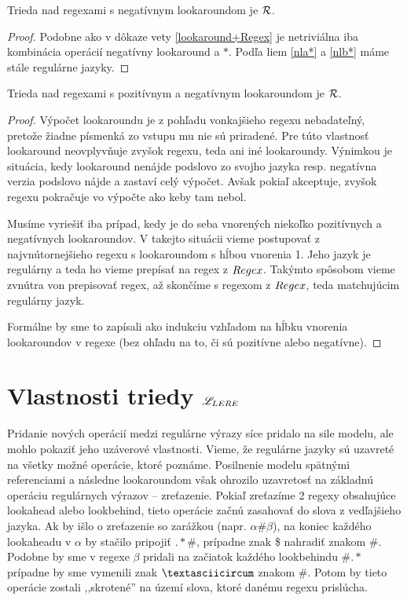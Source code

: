 \begin{veta}\label{nlookaround+R}
Trieda nad regexami s negatívnym lookaroundom je ${\cal R}$.
\end{veta}
\begin{proof}
Podobne ako v dôkaze vety \ref{lookaround+Regex} je netriviálna iba kombinácia operácií negatívny lookaround a $*$. Podľa liem \ref{nla*} a \ref{nlb*} máme stále regulárne jazyky.
\end{proof}

\begin{dosledok}
Trieda nad regexami s pozitívnym a negatívnym lookaroundom je ${\cal R}$.
\end{dosledok}
\begin{proof}
Výpočet lookaroundu je z pohľadu vonkajšieho regexu nebadateľný, pretože žiadne písmenká zo vstupu mu nie sú priradené. Pre túto vlastnosť lookaround ne\-ov\-plyv\-ňu\-je zvyšok regexu, teda ani iné lookaroundy. Výnimkou je situácia, kedy look\-around nenájde podslovo zo svojho jazyka resp. negatívna verzia podslovo nájde a zastaví celý výpočet. Avšak pokiaľ akceptuje, zvyšok regexu pokračuje vo výpočte ako keby tam nebol.

Musíme vyriešiť iba prípad, kedy je do seba vnorených niekoľko pozitívnych a negatívnych lookaroundov. V takejto situácii vieme postupovať z najvnútornejšieho regexu s lookaroundom s hĺbou vnorenia 1. Jeho jazyk je regulárny a teda ho vieme prepísať na regex z $Regex$. Takýmto spôsobom vieme zvnútra von prepisovať regex, až skončíme s regexom z $Regex$, teda matchujúcim regulárny jazyk.

Formálne by sme to zapísali ako indukciu vzhľadom na hĺbku vnorenia lookaroundov v regexe (bez ohľadu na to, či sú pozitívne alebo negatívne).
\end{proof}

\section{Vlastnosti triedy $\mathscr{L}_{LERE}$}

Pridanie nových operácií medzi regulárne výrazy síce pridalo na sile modelu, ale mohlo pokaziť jeho uzáverové vlastnosti. Vieme, že regulárne jazyky sú uzavreté na všetky možné operácie, ktoré poznáme. Posilnenie modelu spätnými referenciami a následne lookaroundom však ohrozilo uzavretosť na základnú operáciu regulárnych výrazov -- zreťazenie. Pokiaľ zreťazíme 2 regexy obsahujúce lookahead alebo lookbehind, tieto operácie začnú zasahovať do slova z vedľajšieho jazyka. Ak by išlo o zreťazenie so zarážkou (napr. $\alpha\#\beta$), na koniec každého lookaheadu v $\alpha$ by stačilo pripojiť $.*\#$, prípadne znak \$ nahradiť znakom \#. Podobne by sme v regexe $\beta$ pridali na začiatok každého lookbehindu $\#.*$ prípadne by sme vymenili znak $\textasciicircum$  znakom \#. Potom by tieto operácie zostali ,,skrotené'' na území slova, ktoré danému regexu prislúcha.

